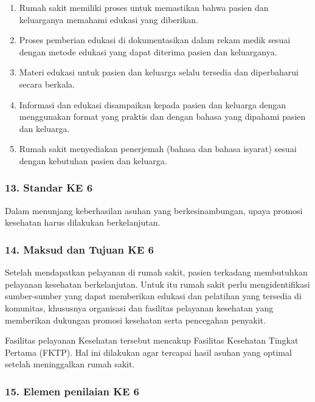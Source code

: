 \documentclass[
]{book}
\providecommand{\tightlist}{%
  \setlength{\itemsep}{0pt}\setlength{\parskip}{0pt}}
\begin{document}
\begin{enumerate}
\def\labelenumi{\alph{enumi}.}
\tightlist
\item
  Rumah sakit memiliki proses untuk memastikan bahwa pasien dan keluarganya memahami edukasi yang diberikan.
\item
  Proses pemberian edukasi di dokumentasikan dalam rekam medik sesuai dengan metode edukasi yang dapat diterima pasien dan keluarganya.
\item
  Materi edukasi untuk pasien dan keluarga selalu tersedia dan diperbaharui secara berkala.
\item
  Informasi dan edukasi disampaikan kepada pasien dan keluarga dengan menggunakan format yang praktis dan dengan bahasa yang dipahami pasien dan keluarga.
\item
  Rumah sakit menyediakan penerjemah (bahasa dan bahasa isyarat) sesuai dengan kebutuhan pasien dan keluarga.
\end{enumerate}

\hypertarget{standar-ke-6}{%
\subsubsection*{13. Standar KE 6}\label{standar-ke-6}}

Dalam menunjang keberhasilan asuhan yang berkesinambungan, upaya promosi kesehatan harus dilakukan berkelanjutan.

\hypertarget{maksud-dan-tujuan-ke-6}{%
\subsubsection*{14. Maksud dan Tujuan KE 6}\label{maksud-dan-tujuan-ke-6}}

Setelah mendapatkan pelayanan di rumah sakit, pasien terkadang membutuhkan pelayanan kesehatan berkelanjutan. Untuk itu rumah sakit perlu mengidentifikasi sumber-sumber yang dapat memberikan edukasi dan pelatihan yang tersedia di komunitas, khususnya organisasi dan fasilitas pelayanan kesehatan yang memberikan dukungan promosi kesehatan serta pencegahan penyakit.

Fasilitas pelayanan Kesehatan tersebut mencakup Fasilitas Kesehatan Tingkat Pertama (FKTP). Hal ini dilakukan agar tercapai hasil asuhan yang optimal setelah meninggalkan rumah sakit.

\hypertarget{elemen-penilaian-ke-6}{%
\subsubsection*{15. Elemen penilaian KE 6}\label{elemen-penilaian-ke-6}}
\end{document}
